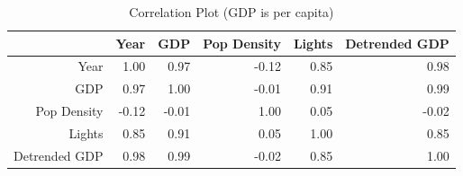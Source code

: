 \begin{table}[ht]
\centering
\caption{Correlation Plot (GDP is per capita)}
\begin{tabular}{r|rrrrr}
  \hline\hline
 & Year & GDP & Pop Density & Lights & Detrended GDP \\ 
  \hline
Year & 1.00 & 0.97 & -0.12 & 0.85 & 0.98 \\ 
  GDP & 0.97 & 1.00 & -0.01 & 0.91 & 0.99 \\ 
  Pop Density & -0.12 & -0.01 & 1.00 & 0.05 & -0.02 \\ 
  Lights& 0.85 & 0.91 & 0.05 & 1.00 & 0.85 \\ 
  Detrended GDP & 0.98 & 0.99 & -0.02 & 0.85 & 1.00 \\ 
   \hline 
\end{tabular}
\end{table}